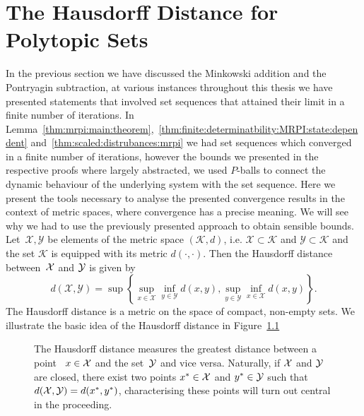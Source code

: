 \chapter{The Hausdorff Distance for Polytopic Sets}\label{appendix:hausdorff:distance:stuff}
\resetcounters
%
In the previous section we have discussed the Minkowski addition and the Pontryagin subtraction, at various instances throughout this thesis we have presented statements that involved set sequences that attained their limit in a finite number of iterations.
%
In Lemma~\ref{thm:mrpi:main:theorem},~\ref{thm:finite:determinatbility:MRPI:state:dependent} and~\ref{thm:scaled:distrubances:mrpi} we had set sequences which converged in a finite number of iterations, however the bounds we presented in the respective proofs where largely abstracted, we used $P$-balls to connect the dynamic behaviour of the underlying system with the set sequence.
%
Here we present the tools necessary to analyse the presented convergence results in the context of metric spaces, where convergence has a precise meaning.
%
We will see why we had to use the previously presented approach to obtain sensible bounds.
%
\\[1em]
%
\mysplit Let~$\mathcal X,\mathcal Y$ be elements of the metric space $(\mathcal K,d)$, i.e. $\mathcal X\subset \mathcal K$ and $\mathcal Y\subset \mathcal K$ and the set $\mathcal K$ is equipped with its metric $d(\cdot,\cdot)$.
%
Then the Hausdorff distance between~$\mathcal X$ and $\mathcal Y$ is given by
%
\begin{equation}
	d(\mathcal X,\mathcal Y) = \sup\left\{\sup_{x\in\mathcal X}\inf_{y\in\mathcal Y} d(x,y), \sup_{y\in\mathcal Y}\inf_{x\in\mathcal X} d(x,y) \right\}.
\end{equation}
%
The Hausdorff distance is a metric on the space of compact, non-empty sets.
%
We illustrate the basic idea of the Hausdorff distance in Figure~\ref{fig:appendix:hausdorff:illustration}
%
\begin{figure}\centering
{}
\caption[Illustration of the Hausdorff metric]{The Hausdorff distance measures the greatest distance between a point ~$x\in\mathcal X$ and the set~$\mathcal Y$ and vice versa. 
%
Naturally, if $\mathcal X$ and $\mathcal Y$ are closed, there exist two points $x^\ast\in\mathcal X$ and $y^\ast\in\mathcal Y$ such that $d(\mathcal X,\mathcal Y)=d(x^\ast,y^\ast)$, characterising these points will turn out central in the proceeding.}
\label{fig:appendix:hausdorff:illustration}
\end{figure}
